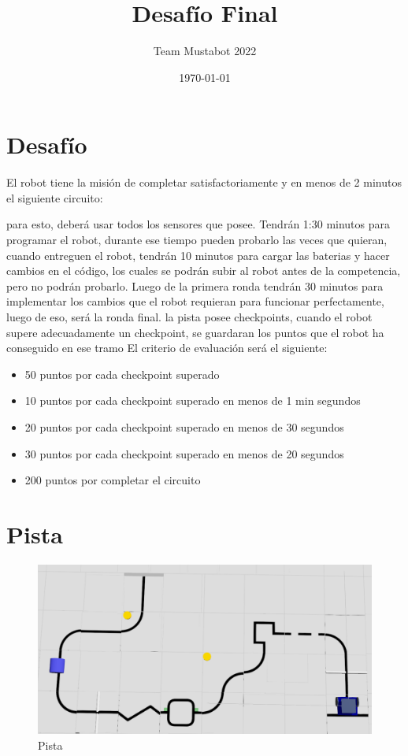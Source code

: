 \documentclass[12pt]{article}
\begin{document}
\title{Desafío Final}
\author{Team Mustabot 2022}
\date{\today}

\maketitle
\section*{Desafío}
El robot tiene la misión de completar satisfactoriamente y en menos de 2 minutos el siguiente circuito:

para esto, deberá usar todos los sensores que posee.
Tendrán 1:30 minutos para programar el robot, durante ese tiempo pueden probarlo las veces que quieran, cuando entreguen el robot, tendrán 10 minutos para cargar las baterias
y hacer cambios en el código, los cuales se podrán subir al robot antes de la competencia, pero no podrán probarlo.
Luego de la primera ronda tendrán 30 minutos para implementar los cambios que el robot requieran para funcionar perfectamente, luego de eso,
será la ronda final.
la pista posee checkpoints, cuando el robot supere adecuadamente un checkpoint, se guardaran los puntos que el robot ha conseguido en ese tramo
El criterio de evaluación será el siguiente:
\begin{itemize}
    \item 50 puntos por cada checkpoint superado
    \item 10 puntos por cada checkpoint superado en menos de 1 min segundos
    \item 20 puntos por cada checkpoint superado en menos de 30 segundos
    \item 30 puntos por cada checkpoint superado en menos de 20 segundos
    \item 200 puntos por completar el circuito
\end{itemize}
\section*{Pista}
\begin{figure}[H]
    \centering
    \includegraphics[width=1.25\textwidth]{simulacion_imagenes/pista_desafio_final.png}
    \caption{Pista}
    \label{fig:pista}
\end{figure}
\end{document}
